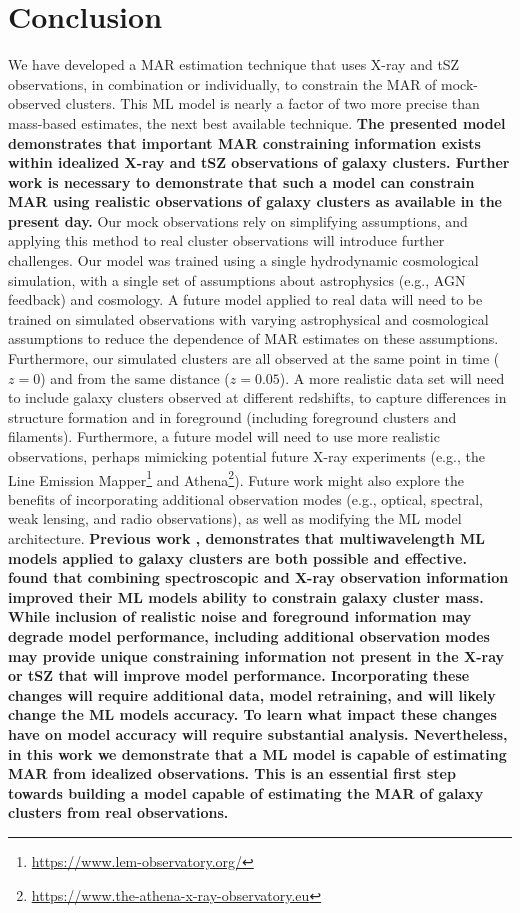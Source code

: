 \documentclass[twocolumn, linenumbers, 11pt]{aastex63}%
\begin{document}
\section{Conclusion}\label{conclusion}
We have developed a MAR estimation technique that uses X-ray and tSZ observations, in combination or individually, to constrain the MAR of mock-observed clusters. This ML model is nearly a factor of two more precise than mass-based estimates, the next best available technique. \textbf{The presented model demonstrates that important MAR constraining information exists within idealized X-ray and tSZ observations of galaxy clusters. Further work is necessary to demonstrate that such a model can constrain MAR using realistic observations of galaxy clusters as available in the present day.} Our mock observations rely on simplifying assumptions, and applying this method to real cluster observations will introduce further challenges. Our model was trained using a single hydrodynamic cosmological simulation, with a single set of assumptions about astrophysics (e.g., AGN feedback) and cosmology. A future model applied to real data will need to be trained on simulated observations with varying astrophysical and cosmological assumptions to reduce the dependence of MAR estimates on these assumptions. Furthermore, our simulated clusters are all observed at the same point in time ($z=0$) and from the same distance ($z=0.05$). A more realistic data set will need to include galaxy clusters observed at different redshifts, to capture differences in structure formation and in foreground (including foreground clusters and filaments). Furthermore, a future model will need to use more realistic observations, perhaps mimicking potential future X-ray experiments (e.g., the Line Emission Mapper\footnote{\url{https://www.lem-observatory.org/}} and Athena\footnote{\url{https://www.the-athena-x-ray-observatory.eu}}). Future work might also explore the benefits of incorporating additional observation modes (e.g., optical, spectral, weak lensing, and radio observations), as well as modifying the ML model architecture. \textbf{Previous work \citep{Ho_2023}, demonstrates that multiwavelength ML models applied to galaxy clusters are both possible and effective. \citet{Ho_2023} found that combining spectroscopic and X-ray observation information improved their ML models ability to constrain galaxy cluster mass. While inclusion of realistic noise and foreground information may degrade model performance, including additional observation modes may provide unique constraining information not present in the X-ray or tSZ that will improve model performance. Incorporating these changes will require additional data, model retraining, and will likely change the ML models accuracy. To learn what impact these changes have on model accuracy will require substantial analysis. Nevertheless, in this work we demonstrate that a ML model is capable of estimating MAR from idealized observations. This is an essential first step towards building a model capable of estimating the MAR of galaxy clusters from real observations.}
\end{document}
